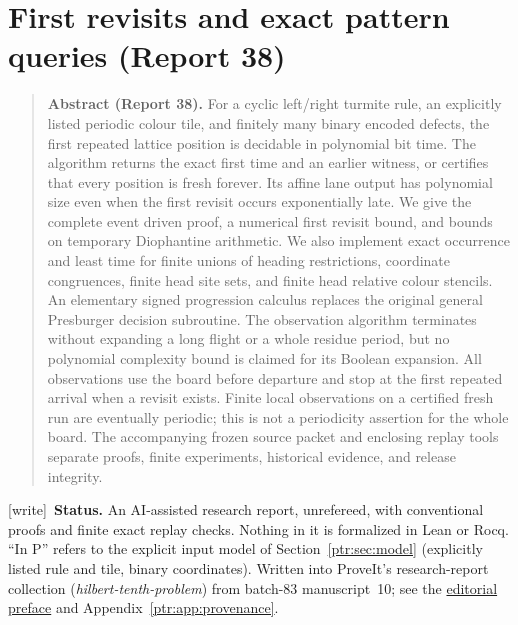 \documentclass[11pt,letterpaper]{article}
\newcommand{\ptrhead}{Front matter}
\theoremstyle{definition}\newtheorem{definition}[theorem]{Definition}
\theoremstyle{remark}\newtheorem{remark}[theorem]{Remark}
\newcommand{\wtag}{\textup{[write]}}
\begin{document}
\part{First revisits and exact pattern queries (Report 38)}\label{ptr:part:fr}
\renewcommand{\ptrhead}{Part I: Report 38}
\begin{quote}\small\noindent\textbf{Abstract (Report 38).} For a cyclic left/right turmite rule, an explicitly listed periodic colour tile, and finitely many binary encoded defects, the first repeated lattice position is decidable in polynomial bit time. The algorithm returns the exact first time and an earlier witness, or certifies that every position is fresh forever. Its affine lane output has polynomial size even when the first revisit occurs exponentially late. We give the complete event driven proof, a numerical first revisit bound, and bounds on temporary Diophantine arithmetic. We also implement exact occurrence and least time for finite unions of heading restrictions, coordinate congruences, finite head site sets, and finite head relative colour stencils. An elementary signed progression calculus replaces the original general Presburger decision subroutine. The observation algorithm terminates without expanding a long flight or a whole residue period, but no polynomial complexity bound is claimed for its Boolean expansion. All observations use the board before departure and stop at the first repeated arrival when a revisit exists. Finite local observations on a certified fresh run are eventually periodic; this is not a periodicity assertion for the whole board. The accompanying frozen source packet and enclosing replay tools separate proofs, finite experiments, historical evidence, and release integrity.
\end{quote}

\begin{center}
\begin{minipage}{0.9\textwidth}\small\raggedright
\noindent\wtag\ \textbf{Status.} An AI-assisted research report, unrefereed,
with conventional proofs and finite exact replay checks. Nothing in it is
formalized in Lean or Rocq. ``In P'' refers to the explicit input model of
Section~\ref{ptr:sec:model} (explicitly listed rule and tile, binary
coordinates). Written into ProveIt's research-report collection
(\emph{hilbert-tenth-problem}) from batch-83 manuscript~10; see the
\hyperref[ptr:sec:preface]{editorial preface} and
Appendix~\ref{ptr:app:provenance}.
\end{minipage}
\end{center}
\end{document}
